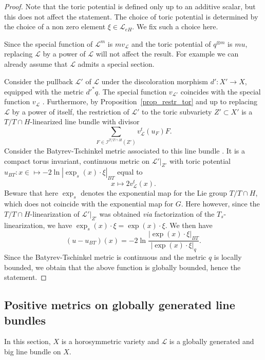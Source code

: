 \documentclass{amsart}
\theoremstyle{definition}
\begin{document}
\begin{proof}
Note that the toric potential is defined only up to an additive scalar, 
but this does not affect the statement. The choice of toric potential is 
determined by the choice of a non zero element $\xi\in \mathcal{L}_{eH}$.
We fix such a choice here.

Since the special function of $\mathcal{L}^m$ is $m v_{\mathcal{L}}$ and 
the toric potential of $q^{\otimes m}$ is $m u$, replacing $\mathcal{L}$ 
by a power of $\mathcal{L}$ will not affect the result. For example 
we can already assume that $\mathcal{L}$ admits a special section. 
 
Consider the pullback $\mathcal{L}'$ of $\mathcal{L}$ under the discoloration 
morphism $d':X'\rightarrow X$, equipped with the metric 
$d'^*q$. The special function $v_{\mathcal{L}'}$ coincides with 
the special function $v_{\mathcal{L}}$ \cite[Proof of Lemma 5.3]{Pas17}.
Furthermore, by Proposition~\ref{prop_restr_tor} and up to replacing 
$\mathcal{L}$ by a power of itself, the restriction of $\mathcal{L}'$ to 
the toric subvariety $Z'\subset X'$ is a $T/T\cap H$-linearized line 
bundle with divisor 
\[
\sum_{F\in \mathcal{I}^{T/T\cap H}(Z')} v_{\mathcal{L}}^t(u_F)F.
\]
Consider the Batyrev-Tschinkel metric associated to this line bundle \cite[Section 3.3]{Mai00}.  
It is a compact torus invariant, continuous metric on $\mathcal{L}'|_{Z'}$ 
with toric potential $u_{BT}:x\in \mapsto -2\ln|\exp_s(x)\cdot \xi|_{BT}$ equal to 
\[
x\mapsto 2v_{\mathcal{L}}^t(x).
\]
Beware that here $\exp_s$ denotes the exponential map for the Lie group 
$T/T\cap H$, which does not coincide with the exponential map for $G$.
Here however, since the $T/T\cap H$-linearization of $\mathcal{L}'|_{Z'}$ 
was obtained \emph{via} factorization of the $T_s$-linearization, 
we have $\exp_s(x)\cdot \xi = \exp(x) \cdot \xi$.
We then have 
\[
(u-u_{BT})(x)=-2\ln\frac{|\exp(x)\cdot \xi|_{BT}}{|\exp(x)\cdot \xi|_{q}}.
\]
Since the Batyrev-Tschinkel metric is continuous and the metric $q$ 
is locally bounded, we obtain that the above function is globally bounded, 
hence the statement.
\end{proof}

\subsection{Positive metrics on globally generated line bundles}

In this section, $X$ is a horosymmetric variety and $\mathcal{L}$ is a globally generated 
and big line bundle on $X$. 
\end{document}
